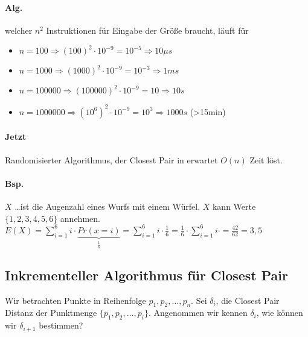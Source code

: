 \paragraph*{Alg.} welcher $n^2$ Instruktionen für Eingabe der Größe braucht, läuft für
\begin{itemize}
	\item[] $n=100 \Rightarrow (100)^2 \cdot 10^{-9} = 10^{-5} \Rightarrow 10\mu s$
	\item[] $n=1000 \Rightarrow (1000)^2 \cdot 10^{-9} = 10^{-3} \Rightarrow 1ms$
	\item[] $n=100000 \Rightarrow (100000)^2 \cdot 10^{-9} = 10 \Rightarrow 10s$
	\item[] $n=1000000 \Rightarrow (10^6)^2 \cdot 10^{-9} = 10^3 \Rightarrow 1000s$ (>15min)
\end{itemize}


\paragraph*{Jetzt} Randomisierter Algorithmus, der Closest Pair in erwartet $O(n)$ Zeit löst.


\paragraph*{Bsp.} $X$ \dots ist die Augenzahl eines Wurfs mit einem Würfel. $X$ kann Werte $\{ 1,2,3,4,5,6 \}$ annehmen. $E(X) = \sum\limits_{i=1}^{6} i \cdot \underbrace{Pr(x=i)}_{\frac{1}{6}} = \sum\limits_{i=1}^{6} i \cdot \frac{1}{6} = \frac{1}{6} \cdot \sum\limits_{i=1}^{6} i \cdot = \frac{42}{62} = 3,5$



\subsection{Inkrementeller Algorithmus für Closest Pair}
Wir betrachten Punkte in Reihenfolge $p_1,p_2,\dots,p_n$. Sei $\delta_i$, die Closest Pair Distanz der Punktmenge $\{ p_1,p_2,\dots,p_i \}$. Angenommen wir kennen $\delta_i$, wie können wir $\delta_{i+1}$ bestimmen?

